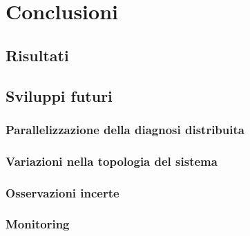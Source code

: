 \chapter{Conclusioni}
\section{Risultati}

\section{Sviluppi futuri}

\subsection{Parallelizzazione della diagnosi distribuita}

\subsection{Variazioni nella topologia del sistema}

\subsection{Osservazioni incerte}

\subsection{Monitoring}